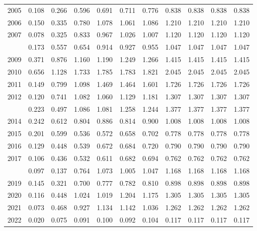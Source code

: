 \documentclass[
]{article}
\begin{document}
\begin{longtable}[t]{lrrrrrrrrrr}
2005 & 0.108 & 0.266 & 0.596 & 0.691 & 0.711 & 0.776 & 0.838 & 0.838 & 0.838 & 0.838\\
2006 & 0.150 & 0.335 & 0.780 & 1.078 & 1.061 & 1.086 & 1.210 & 1.210 & 1.210 & 1.210\\
2007 & 0.078 & 0.325 & 0.833 & 0.967 & 1.026 & 1.007 & 1.120 & 1.120 & 1.120 & 1.120\\
\addlinespace
2008 & 0.173 & 0.557 & 0.654 & 0.914 & 0.927 & 0.955 & 1.047 & 1.047 & 1.047 & 1.047\\
2009 & 0.371 & 0.876 & 1.160 & 1.190 & 1.249 & 1.266 & 1.415 & 1.415 & 1.415 & 1.415\\
2010 & 0.656 & 1.128 & 1.733 & 1.785 & 1.783 & 1.821 & 2.045 & 2.045 & 2.045 & 2.045\\
2011 & 0.149 & 0.799 & 1.098 & 1.469 & 1.464 & 1.601 & 1.726 & 1.726 & 1.726 & 1.726\\
2012 & 0.120 & 0.741 & 1.082 & 1.060 & 1.129 & 1.181 & 1.307 & 1.307 & 1.307 & 1.307\\
\addlinespace
2013 & 0.223 & 0.497 & 1.086 & 1.081 & 1.258 & 1.244 & 1.377 & 1.377 & 1.377 & 1.377\\
2014 & 0.242 & 0.612 & 0.804 & 0.886 & 0.814 & 0.900 & 1.008 & 1.008 & 1.008 & 1.008\\
2015 & 0.201 & 0.599 & 0.536 & 0.572 & 0.658 & 0.702 & 0.778 & 0.778 & 0.778 & 0.778\\
2016 & 0.129 & 0.448 & 0.539 & 0.672 & 0.684 & 0.720 & 0.790 & 0.790 & 0.790 & 0.790\\
2017 & 0.106 & 0.436 & 0.532 & 0.611 & 0.682 & 0.694 & 0.762 & 0.762 & 0.762 & 0.762\\
\addlinespace
2018 & 0.097 & 0.137 & 0.764 & 1.073 & 1.005 & 1.047 & 1.168 & 1.168 & 1.168 & 1.168\\
2019 & 0.145 & 0.321 & 0.700 & 0.777 & 0.782 & 0.810 & 0.898 & 0.898 & 0.898 & 0.898\\
2020 & 0.116 & 0.448 & 1.024 & 1.019 & 1.204 & 1.175 & 1.305 & 1.305 & 1.305 & 1.305\\
2021 & 0.073 & 0.468 & 0.927 & 1.134 & 1.142 & 1.036 & 1.262 & 1.262 & 1.262 & 1.262\\
2022 & 0.020 & 0.075 & 0.091 & 0.100 & 0.092 & 0.104 & 0.117 & 0.117 & 0.117 & 0.117\\*
\end{longtable}
\end{document}

